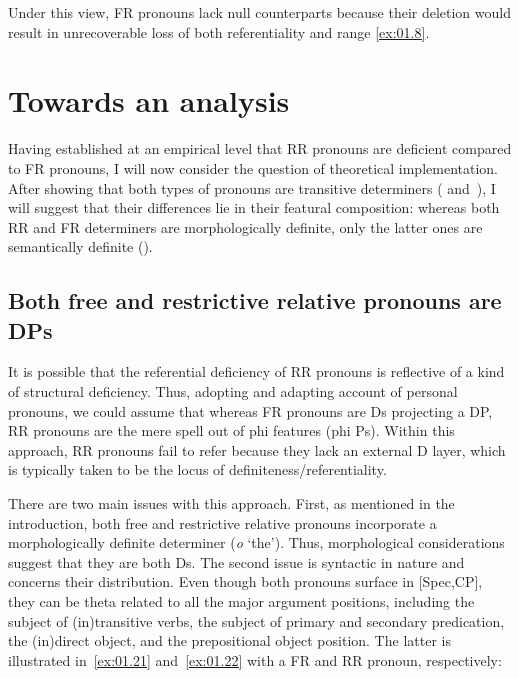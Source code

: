 \documentclass[output=paper]{langsci/langscibook}
\begin{document}
Under this view, \gls{FR} pronouns lack null counterparts because their
deletion would result in unrecoverable loss of both referentiality and range
\eqref{ex:01.8}.

\section{Towards an analysis}\label{sec:01.4}

Having established at an empirical level that \gls{RR} pronouns are deficient compared to \gls{FR}
pronouns, I will now consider the question of theoretical implementation.
After showing that both types of pronouns are transitive determiners
( and~), I will suggest that their differences
lie in their featural composition: whereas both \gls{RR} and \gls{FR}
determiners are morphologically definite, only the latter ones are semantically
definite ().

\subsection{Both free and restrictive relative pronouns are DPs}\label{sub:01.4.1}

It is possible that the referential deficiency of \gls{RR} pronouns is reflective of a kind of
structural deficiency. Thus, adopting and adapting  account
of personal pronouns, we could assume that whereas \gls{FR} pronouns are Ds
projecting a DP, \gls{RR} pronouns are the mere spell out of phi features (phi Ps).
Within this approach, \gls{RR} pronouns fail to refer because they lack an external D layer, which
is typically taken to be the locus of definiteness/referentiality.

There are two main issues with this approach. First, as mentioned in the
introduction, both free and restrictive relative pronouns incorporate a
morphologically definite determiner (\emph{o} ‘the’). Thus, morphological
considerations suggest that they are both Ds. The second issue is syntactic in
nature and concerns their distribution. Even though both pronouns surface in
[Spec,CP], they can be theta related to all the major argument positions,
including the subject of (in)transitive verbs, the subject of primary and
secondary predication, the (in)direct object, and the prepositional object
position. The latter is illustrated in~\eqref{ex:01.21}
and~\eqref{ex:01.22} with a \gls{FR} and \gls{RR} pronoun, respectively:
\end{document}
